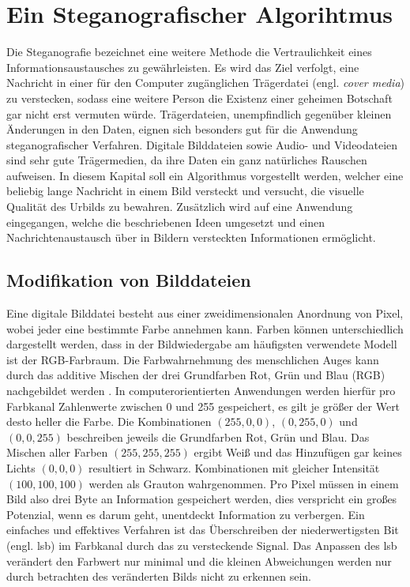 \chapter{Ein Steganografischer Algorihtmus}
Die Steganografie bezeichnet eine weitere Methode die Vertraulichkeit eines
Informationsaustausches zu gewährleisten.
Es wird das Ziel verfolgt, eine Nachricht in einer für den Computer
zugänglichen Trägerdatei (engl. \textit{cover media}) zu verstecken, sodass eine
weitere Person die Existenz
einer geheimen Botschaft gar nicht erst vermuten würde. Trägerdateien, unempfindlich
gegenüber kleinen Änderungen in den Daten, eignen sich besonders gut für die
Anwendung steganografischer Verfahren. Digitale Bilddateien sowie Audio- und Videodateien
sind sehr gute Trägermedien,
da ihre Daten ein ganz natürliches Rauschen aufweisen.
In diesem Kapital soll ein Algorithmus vorgestellt werden, welcher
eine beliebig lange Nachricht in einem Bild versteckt und versucht,
die visuelle Qualität des Urbilds zu bewahren.
Zusätzlich wird auf eine Anwendung eingegangen, welche die beschriebenen
Ideen umgesetzt und einen Nachrichtenaustausch über
in Bildern versteckten Informationen ermöglicht.

\section{Modifikation von Bilddateien}
Eine digitale Bilddatei besteht aus einer zweidimensionalen Anordnung von Pixel, wobei
jeder eine bestimmte Farbe annehmen kann. Farben können unterschiedlich
dargestellt werden, dass in der Bildwiedergabe am häufigsten verwendete Modell ist
der RGB-Farbraum. Die Farbwahrnehmung des menschlichen Auges kann durch
das additive Mischen der drei Grundfarben Rot, Grün und Blau (RGB)
nachgebildet werden \parencite[32-40]{BOOK:VC}. In computerorientierten Anwendungen
werden hierfür pro Farbkanal Zahlenwerte zwischen 0 und 255 gespeichert,
es gilt je größer der Wert desto heller die Farbe. Die Kombinationen
$(255,0,0)$, $(0,255,0)$ und $(0,0,255)$ beschreiben jeweils die Grundfarben Rot, Grün und Blau.
Das Mischen aller Farben $(255,255,255)$ ergibt Weiß und das Hinzufügen gar keines
Lichts $(0,0,0)$ resultiert in Schwarz. Kombinationen mit gleicher Intensität
$(100,100,100)$ werden als Grauton wahrgenommen. Pro Pixel müssen in einem Bild
also drei Byte an Information gespeichert werden, dies verspricht ein großes
Potenzial, wenn es darum geht, unentdeckt Information zu verbergen. Ein
einfaches und effektives Verfahren ist das Überschreiben der niederwertigsten
Bit (engl. \ac{lsb}) im Farbkanal
durch das zu versteckende Signal. Das Anpassen
des \acs{lsb} verändert den Farbwert nur minimal und
die kleinen Abweichungen werden nur durch betrachten des veränderten Bilds
nicht zu erkennen sein.

